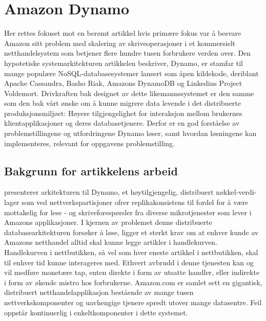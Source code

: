 \section{Amazon Dynamo}

Her rettes fokuset mot en berømt artikkel hvis primære fokus var å besvare Amazon sitt problem med skalering av skriveoperasjoner i et kommersielt netthandelsystem som betjener flere hundre tusen forbrukere verden over. Den hypotetiske systemarkitekturen artikkelen beskriver, Dynamo, er stamfar til mange populære NoSQL-databasesystemer lansert som åpen kildekode, deriblant Apache Cassandra, Basho Riak, Amazons DynamoDB og Linkedins Project Voldemort. Drivkraften bak designet av dette likemannssystemet er den samme som den bak vårt ønske om å kunne migrere data levende i det distribuerte produksjonsmiljøet: Høyere tilgjengelighet for interaksjon mellom brukernes klientapplikasjoner og deres databasetjenere. Derfor er en god forståelse av problemstillingene og utfordringene Dynamo løser, samt hvordan løsningene kan implementeres, relevant for oppgavens problemstilling.

\subsection{Bakgrunn for artikkelens arbeid}

\cite{decandia2007} presenterer arkitekturen til Dynamo, et høytilgjengelig, distribuert nøkkel-verdi-lager som ved nettverkspartisjoner ofrer replikakonsistens til fordel for å være mottakelig for lese - og skriveforespørsler fra diverse mikrotjenester som lever i Amazons applikasjoner. I kjernen av problemet denne distribuerte databasearkitekturen forsøker å løse, ligger et sterkt krav om at enhver kunde av Amazons netthandel alltid skal kunne legge artikler i handlekurven. Handlekurven i nettbutikken, så vel som hver eneste artikkel i nettbutikken, skal til enhver tid kunne interageres med. Ethvert avbrudd i denne tjenesten kan og vil medføre monetære tap, enten direkte i form av utsatte handler, eller indirekte i form av økende mistro hos forbrukerne. Amazon.com er samlet sett en gigantisk, distribuert netthandelapplikasjon bestående av mange tusen nettverkskomponenter og uavhengige tjenere spredt utover mange datasentre. Feil oppstår kontinuerlig i enkeltkomponenter i dette systemet.

